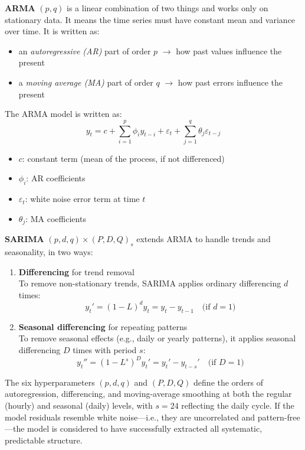 \textbf{ARMA} $(p, q)$ is a linear combination of two things and works only on 
stationary data. It means the time series must have constant mean and variance over 
time. It is written as:
\begin{itemize}
    \item an \emph{autoregressive (AR)} part of order $p$ $\rightarrow$ how past values influence the present
    \item a \emph{moving average (MA)} part of order $q$ $\rightarrow$ how past errors influence the present
\end{itemize}
The ARMA model is written as:
$$
y_t = c + \sum_{i=1}^{p} \phi_i y_{t-i} + \varepsilon_t + \sum_{j=1}^{q} \theta_j \varepsilon_{t-j}
$$
\begin{itemize}
    \item $c$: constant term (mean of the process, if not differenced)
    \item $\phi_i$: AR coefficients
    \item $\varepsilon_t$: white noise error term at time $t$
    \item $\theta_j$: MA coefficients
\end{itemize}

\textbf{SARIMA} $(p,d,q)\times(P,D,Q)_s$ extends ARMA to handle trends and 
seasonality, in two ways: 
\begin{enumerate}
    \item \textbf{Differencing} for trend removal \\
        To remove non-stationary trends, SARIMA applies ordinary differencing $d$ times:
        \[
        y_t' = (1 - L)^d y_t = y_t - y_{t-1} \quad \text{(if } d = 1\text{)}
        \]
    \item \textbf{Seasonal differencing} for repeating patterns \\
        To remove seasonal effects (e.g., daily or yearly patterns), it applies 
        seasonal differencing $D$ times with period $s$:
        \[
        y_t'' = (1 - L^s)^D y_t' = y_t' - y_{t-s}' \quad \text{(if } D = 1\text{)}
        \]
\end{enumerate}

The six hyperparameters $(p,d,q)$ and $(P,D,Q)$ define the orders of autoregression, 
differencing, and moving-average smoothing at both the regular (hourly) and seasonal 
(daily) levels, with $s = 24$ reflecting the daily cycle. If the model residuals 
resemble white noise—i.e., they are uncorrelated and pattern-free—the model is 
considered to have successfully extracted all systematic, predictable structure.

